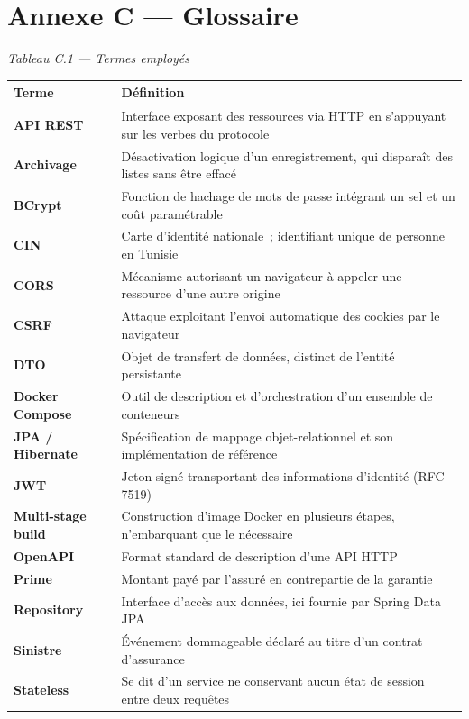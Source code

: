 \documentclass[12pt,a4paper]{report}
\begin{document}
\chapter*{Annexe C — Glossaire}
\begin{center}\textit{Tableau C.1 — Termes employés}\end{center}
{\small
\begin{tabularx}{\linewidth}{|X|X|}
\hline
\textbf{Terme} & \textbf{Définition} \\ \hline
\textbf{API REST} & Interface exposant des ressources via HTTP en s'appuyant sur les verbes du protocole \\ \hline
\textbf{Archivage} & Désactivation logique d'un enregistrement, qui disparaît des listes sans être effacé \\ \hline
\textbf{BCrypt} & Fonction de hachage de mots de passe intégrant un sel et un coût paramétrable \\ \hline
\textbf{CIN} & Carte d'identité nationale~; identifiant unique de personne en Tunisie \\ \hline
\textbf{CORS} & Mécanisme autorisant un navigateur à appeler une ressource d'une autre origine \\ \hline
\textbf{CSRF} & Attaque exploitant l'envoi automatique des cookies par le navigateur \\ \hline
\textbf{DTO} & Objet de transfert de données, distinct de l'entité persistante \\ \hline
\textbf{Docker Compose} & Outil de description et d'orchestration d'un ensemble de conteneurs \\ \hline
\textbf{JPA / Hibernate} & Spécification de mappage objet-relationnel et son implémentation de référence \\ \hline
\textbf{JWT} & Jeton signé transportant des informations d'identité (RFC 7519) \\ \hline
\textbf{Multi-stage build} & Construction d'image Docker en plusieurs étapes, n'embarquant que le nécessaire \\ \hline
\textbf{OpenAPI} & Format standard de description d'une API HTTP \\ \hline
\textbf{Prime} & Montant payé par l'assuré en contrepartie de la garantie \\ \hline
\textbf{Repository} & Interface d'accès aux données, ici fournie par Spring Data JPA \\ \hline
\textbf{Sinistre} & Événement dommageable déclaré au titre d'un contrat d'assurance \\ \hline
\textbf{Stateless} & Se dit d'un service ne conservant aucun état de session entre deux requêtes \\ \hline
\end{tabularx}

}
\end{document}
